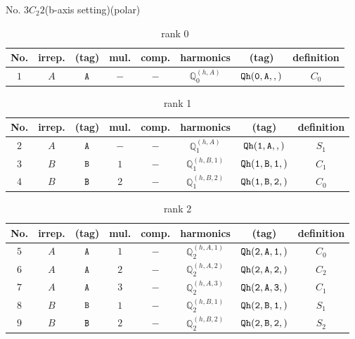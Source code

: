 \documentclass[fleqn,8pt]{jsarticle}
\begin{document}
\setcounter{MaxMatrixCols}{16}

\begin{center}
\LARGE
No. 3\quad$C_{2}$\quad$2$\quad(b-axis setting)\quad[ monoclinic ] (polar)
\end{center}
\begin{table}[ht!]
\begin{center}
\caption{rank 0}
\renewcommand{\arraystretch}{1.3}
\begin{tabular}{cccccccc} \hline \hline
No. & irrep. & (tag) & mul. & comp. & harmonics & (tag) & definition \\ \hline
$ 1 $ & $ A $ & $ {\tt A} $ & $ - $ & $ - $ & $ \mathbb{Q}_{0}^{(h,A)} $ & $ {\tt Qh(0,A,,)} $ & $ C_{0} $ \\
 \hline \hline
\end{tabular}
\end{center}
\end{table}
\begin{table}[ht!]
\begin{center}
\caption{rank 1}
\renewcommand{\arraystretch}{1.3}
\begin{tabular}{cccccccc} \hline \hline
No. & irrep. & (tag) & mul. & comp. & harmonics & (tag) & definition \\ \hline
$ 2 $ & $ A $ & $ {\tt A} $ & $ - $ & $ - $ & $ \mathbb{Q}_{1}^{(h,A)} $ & $ {\tt Qh(1,A,,)} $ & $ S_{1} $ \\
$ 3 $ & $ B $ & $ {\tt B} $ & $ 1 $ & $ - $ & $ \mathbb{Q}_{1}^{(h,B,1)} $ & $ {\tt Qh(1,B,1,)} $ & $ C_{1} $ \\
$ 4 $ & $ B $ & $ {\tt B} $ & $ 2 $ & $ - $ & $ \mathbb{Q}_{1}^{(h,B,2)} $ & $ {\tt Qh(1,B,2,)} $ & $ C_{0} $ \\
 \hline \hline
\end{tabular}
\end{center}
\end{table}
\begin{table}[ht!]
\begin{center}
\caption{rank 2}
\renewcommand{\arraystretch}{1.3}
\begin{tabular}{cccccccc} \hline \hline
No. & irrep. & (tag) & mul. & comp. & harmonics & (tag) & definition \\ \hline
$ 5 $ & $ A $ & $ {\tt A} $ & $ 1 $ & $ - $ & $ \mathbb{Q}_{2}^{(h,A,1)} $ & $ {\tt Qh(2,A,1,)} $ & $ C_{0} $ \\
$ 6 $ & $ A $ & $ {\tt A} $ & $ 2 $ & $ - $ & $ \mathbb{Q}_{2}^{(h,A,2)} $ & $ {\tt Qh(2,A,2,)} $ & $ C_{2} $ \\
$ 7 $ & $ A $ & $ {\tt A} $ & $ 3 $ & $ - $ & $ \mathbb{Q}_{2}^{(h,A,3)} $ & $ {\tt Qh(2,A,3,)} $ & $ C_{1} $ \\
$ 8 $ & $ B $ & $ {\tt B} $ & $ 1 $ & $ - $ & $ \mathbb{Q}_{2}^{(h,B,1)} $ & $ {\tt Qh(2,B,1,)} $ & $ S_{1} $ \\
$ 9 $ & $ B $ & $ {\tt B} $ & $ 2 $ & $ - $ & $ \mathbb{Q}_{2}^{(h,B,2)} $ & $ {\tt Qh(2,B,2,)} $ & $ S_{2} $ \\
 \hline \hline
\end{tabular}
\end{center}
\end{table}
\end{document}
